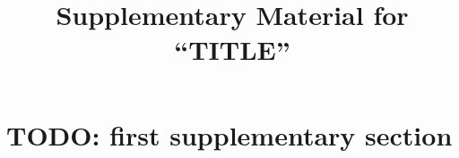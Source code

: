 \documentclass[11pt,a4paper]{article}
\title{Supplementary Material for\\ ``{{TITLE}}''}
\date{}
\begin{document}
\maketitle

\section{TODO: first supplementary section}\label{sec:S1}


\end{document}
